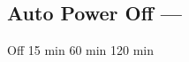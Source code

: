 \subsection[Auto Power Off]{Auto Power Off --- \UiKey{\SET}}









































Off
15 min
60 min
120 min
